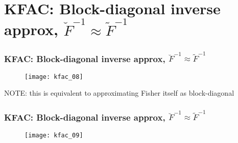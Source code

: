 \section{KFAC: Block-diagonal inverse approx, $\breve{F}^{-1} \approx \tilde{F}^{-1}$}

\begin{frame}
\frametitle{KFAC: Block-diagonal inverse approx, $\breve{F}^{-1} \approx \tilde{F}^{-1}$}
\begin{figure}
    \centering
    \texttt{[image: kfac\_08]}
\end{figure}
NOTE: this is equivalent to approximating Fisher itself as block-diagonal
\end{frame}

\begin{frame}
\frametitle{KFAC: Block-diagonal inverse approx, $\breve{F}^{-1} \approx \tilde{F}^{-1}$}
\begin{figure}
    \centering
    \texttt{[image: kfac\_09]}
\end{figure}
\end{frame}
